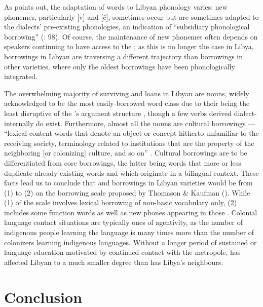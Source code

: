 \documentclass[output=paper]{langsci/langscibook}
\begin{document}
  As \citet{Danna2018phonetic} points out, the adaptation of  words to Libyan  phonology varies: new phonemes, particularly  [v] and [č], sometimes occur but are sometimes adapted to the dialects’ pre-existing phonologies, an indication of “subsidiary phonological borrowing” (\citealt{VanCoetsem1988}: 98). Of course, the maintenance of new phonemes often depends on speakers continuing to have access to the ; as this is no longer the case in Libya,  borrowings in Libyan  are traversing a different trajectory than  borrowings in other  varieties, where only the oldest borrowings have been phonologically integrated.

  The overwhelming majority of surviving  and  loans in Libyan  are nouns, widely acknowledged to be the most easily-borrowed word class due to their being the least disruptive of the ’s argument structure \citep{Myers-Scotton2002}, though a few verbs derived dialect-internally do exist. Furthermore, almost all the nouns are cultural borrowings — “lexical content-words that denote an object or concept hitherto unfamiliar to the receiving society, terminology related to institutions that are the property of the neighboring [or colonizing] culture, and so on” \citep[210]{Matras2011universals}. Cultural borrowings are to be differentiated from core borrowings, the latter being words that more or less duplicate already existing words and which originate in a bilingual  context. These facts lead us to conclude that  and  borrowings in Libyan varieties would be from (1) to (2) on the borrowing scale proposed by Thomason \& Kaufman (\citeyear[78–83]{ThomasonKaufman1988}). While (1) of the scale involves lexical borrowing of non-basic vocabulary only, (2) includes some function words as well as new phones appearing in those . Colonial language contact situations are typically ones of  agentivity, as the number of indigenous people learning the  language is many times more than the number of colonizers learning indigenous languages. Without a longer period of sustained  or language education motivated by continued contact with the metropole,  has affected Libyan  to a much smaller degree than  has Libya's  neighbours.

\section{Conclusion}
\end{document}
